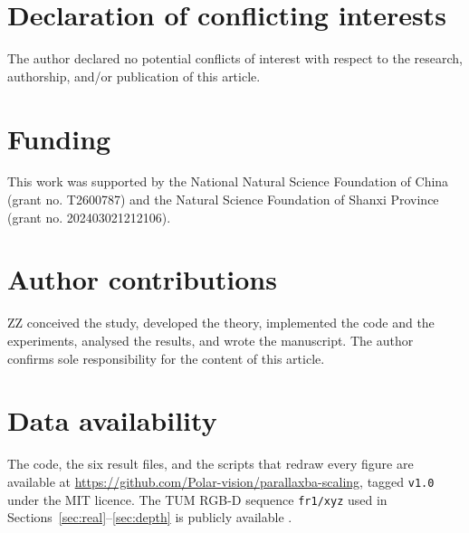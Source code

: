 \documentclass[11pt,a4paper]{article}
\let\cite\citep
\theoremstyle{definition}
\theoremstyle{remark}
\begin{document}
\section*{Declaration of conflicting interests}
The author declared no potential conflicts of interest with respect to the research, authorship, and/or publication of this article.

\section*{Funding}
This work was supported by the National Natural Science Foundation of China (grant no. T2600787) and the Natural Science Foundation of Shanxi Province (grant no. 202403021212106).

\section*{Author contributions}
ZZ conceived the study, developed the theory, implemented the code and the experiments, analysed the results, and wrote the manuscript. The author confirms sole responsibility for the content of this article.

\section*{Data availability}
The code, the six result files, and the scripts that redraw every figure are available at \url{https://github.com/Polar-vision/parallaxba-scaling}, tagged \texttt{v1.0} under the MIT licence. The TUM RGB-D sequence \texttt{fr1/xyz} used in Sections~\ref{sec:real}--\ref{sec:depth} is publicly available \cite{sturm2012benchmark}.



\end{document}
